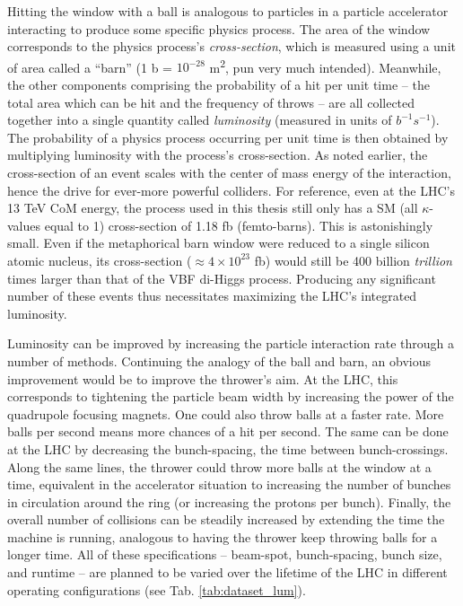     Hitting the window with a ball is analogous to particles in a particle accelerator interacting to produce some specific physics process.
    The area of the window corresponds to the physics process's \textit{cross-section}, which is measured using a unit of area called a ``barn'' (1 b = $10^{-28}$ m\textsuperscript{2}, pun very much intended).
    Meanwhile, the other components comprising the probability of a hit per unit time
        -- the total area which can be hit and the frequency of throws --
        are all collected together into a single quantity called \textit{luminosity} (measured in units of $b^{-1}s^{-1}$). 
    The probability of a physics process occurring per unit time is then obtained by multiplying luminosity with the process's cross-section.
    As noted earlier, the cross-section of an event scales with the center of mass energy of the interaction,
        hence the drive for ever-more powerful colliders.
    For reference, even at the LHC's 13 TeV CoM energy,
        the \vbfhhproc process used in this thesis still only has a SM (all $\kappa$-values equal to 1) cross-section of 1.18 fb (femto-barns).
    This is astonishingly small.
    Even if the metaphorical barn window were reduced to a single silicon atomic nucleus,
        its cross-section ($\approx 4 \times 10^{23}$ fb)
        would still be 400 billion \textit{trillion} times larger than that of the VBF di-Higgs process.
    Producing any significant number of these events thus necessitates maximizing the LHC's integrated luminosity.

    Luminosity can be improved by increasing the particle interaction rate through a number of methods.
    Continuing the analogy of the ball and barn, an obvious improvement would be to improve the thrower's aim.
    At the LHC, this corresponds to tightening the particle beam width by increasing the power of the quadrupole focusing magnets.
    One could also throw balls at a faster rate.
    More balls per second means more chances of a hit per second.
    The same can be done at the LHC by decreasing the bunch-spacing, the time between bunch-crossings.
    Along the same lines, the thrower could throw more balls at the window at a time,
        equivalent in the accelerator situation to increasing the number of bunches in circulation around the ring
        (or increasing the protons per bunch).
    Finally, the overall number of collisions can be steadily increased by extending the time the machine is running, analogous to having the thrower keep throwing balls for a longer time.
    All of these specifications -- beam-spot, bunch-spacing, bunch size, and runtime -- are planned to be varied over the lifetime of the LHC in different operating configurations (see Tab. \ref{tab:dataset_lum}).
    
